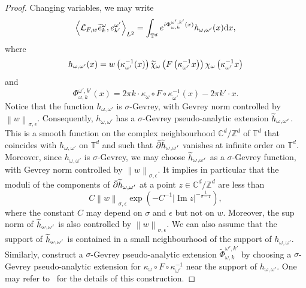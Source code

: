 \documentclass[AHL,Unicode,longabstracts,published]{cedram}
\DeclareMathOperator{\im}{Im}
\newcommand{\p}[1]{\left(#1\right)}
\newcommand{\n}[1]{\left\|#1\right\|}
\newcommand{\va}[1]{\left|#1\right|}
\newcommand{\clL}{\mathcal{L}}
\newcommand{\bbZ}{\mathbb{Z}}
\newcommand{\bbC}{\mathbb{C}}
\newcommand{\bbT}{\mathbb{T}}
\newcommand{\rmd}{\mathrm{d}}
\let\oldtilde\tilde
\renewcommand*{\tilde}[1]{\mathchoice{\widetilde{#1}}{\widetilde{#1}}{\oldtilde{#1}}{\oldtilde{#1}}}
\begin{document}
\begin{proof}
Changing variables, we may write
\begin{equation}\label{eq:in_the_chart}
\left\langle \clL_{F,w} \tilde{e}_{k}^{\omega}, e_{k'}^{\omega'}\right\rangle_{L^2} = \int_{\bbT^d} e^{i \Phi_{\omega,k}^{\omega',k'} (x)} h_{\omega,\omega'}(x) \rmd x,
\end{equation}
where
\begin{equation*}
h_{\omega,\omega'}(x) = w\left(\kappa_{\omega'}^{-1}(x)\right)\tilde{\chi}_{\omega}\left(F\left(\kappa_{\omega'}^{-1} x\right)\right) \chi_\omega\left(\kappa_{\omega'}^{-1}x\right)
\end{equation*}
and
\begin{equation*}
\Phi_{\omega,k}^{\omega',k'}(x) = 2 \pi k \cdot \kappa_{\omega} \circ F \circ \kappa_{\omega'}^{-1}(x) - 2 \pi k' \cdot x.
\end{equation*}
Notice that the function $h_{\omega,\omega'}$ is $\sigma$-Gevrey, with Gevrey norm controlled by $\n{w}_{\sigma,\epsilon}$. Consequently, $h_{\omega,\omega'}$ has a $\sigma$-Gevrey pseudo-analytic extension $\tilde{h}_{\omega,\omega'}$. This is a smooth function on the complex neighbourhood $\bbC^d / \bbZ^d$ of $\bbT^d$ that coincides with $h_{\omega,\omega'}$ on $\bbT^d$ and such that $\bar{\partial} \tilde{h}_{\omega,\omega'}$ vanishes at infinite order on $\bbT^d$. Moreover, since $h_{\omega,\omega'}$ is $\sigma$-Gevrey, we may choose $\tilde{h}_{\omega,\omega'}$ as a $\sigma$-Gevrey function, with Gevrey norm controlled by $\n{w}_{\sigma,\epsilon}$. It implies in particular that the moduli of the components of $\bar{\partial} \tilde{h}_{\omega,\omega'}$ at a point $z \in \bbC^d / \bbZ^d$ are less than
\begin{equation}\label{eq:bound_dbar}
C \n{w}_{\sigma,\epsilon} \exp\p{ - C^{-1} \va{\im z}^{- \frac{1}{\sigma - 1}}},
\end{equation}
where the constant $C$ may depend on $\sigma$ and $\epsilon$ but not on $w$. Moreover, the sup norm of $\tilde{h}_{\omega,\omega'}$ is also controlled by $\n{w}_{\sigma,\epsilon}$. We can also assume that the support of $\tilde{h}_{\omega,\omega'}$ is contained in a small neighbourhood of the support of $h_{\omega,\omega'}$. Similarly, construct a $\sigma$-Gevrey pseudo-analytic extension $\widetilde{\Phi}_{\omega,k}^{\omega',k'}$ by choosing a $\sigma$-Gevrey pseudo-analytic extension for $\kappa_\omega \circ F \circ \kappa_{\omega'}^{-1}$ near the support of $h_{\omega,\omega'}$. One may refer to~\cite[\S 1.1.1.3]{BJ20} for the details of this construction.


\end{proof}
\end{document}
